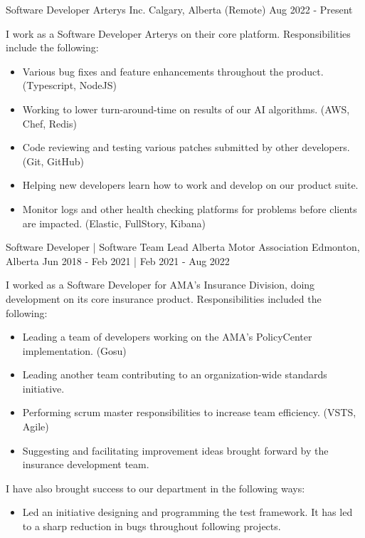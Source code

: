 
\begin{cventries}
    \cventry
        {Software Developer}
        {Arterys Inc.}
        {Calgary, Alberta (Remote)}
        {Aug 2022 - Present}
        {
            I work as a Software Developer Arterys on their core platform.  Responsibilities include the following:
            \begin{itemize}
                \item Various bug fixes and feature enhancements throughout the product. (Typescript, NodeJS)
                \item Working to lower turn-around-time on results of our AI algorithms. (AWS, Chef, Redis)
                \item Code reviewing and testing various patches submitted by other developers. (Git, GitHub)
                \item Helping new developers learn how to work and develop on our product suite. 
                \item Monitor logs and other health checking platforms for problems before clients are impacted. (Elastic, FullStory, Kibana)
            \end{itemize}
        }
    \cventry
        {Software Developer | Software Team Lead}
        {Alberta Motor Association}
        {Edmonton, Alberta}
        {Jun 2018 - Feb 2021 | Feb 2021 - Aug 2022}
        {
            I worked as a Software Developer for AMA’s Insurance Division, doing development on its core insurance product.  Responsibilities included the following:
            \begin{itemize}
                \item Leading a team of developers working on the AMA's PolicyCenter implementation. (Gosu)
                \item Leading another team contributing to an organization-wide standards initiative. 
                \item Performing scrum master responsibilities to increase team efficiency. (VSTS, Agile)
                \item Suggesting and facilitating improvement ideas brought forward by the insurance development team.
            \end{itemize}
            I have also brought success to our department in the following ways:
            \begin{itemize}
                \item Led an initiative designing and programming the test framework.  It has led to a sharp reduction in bugs throughout following projects.

\end{itemize}}
\end{cventries}
